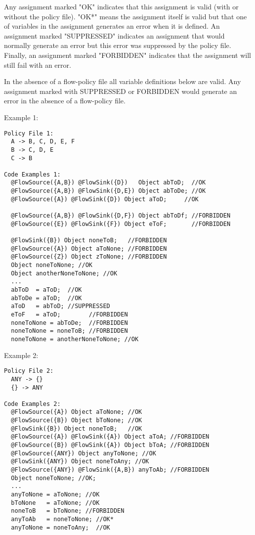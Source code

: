 Any assignment marked "OK" indicates that this assignment is valid
(with or without the policy file).  "OK*" means the assignment itself
is valid but that one of variables in the assignment generates an
error when it is defined.  An assignment marked "SUPPRESSED"
indicates an assignment that would normally generate an error but
this error was suppressed by the policy file.  Finally, an assignment
marked "FORBIDDEN" indicates that the assignment will still fail
with an error.

In the absence of a flow-policy file all variable definitions
below are valid.  Any assignment marked with SUPPRESSED or FORBIDDEN
would generate an error in the absence of a flow-policy file.

Example 1:
\begin{Verbatim}
Policy File 1:
  A -> B, C, D, E, F
  B -> C, D, E
  C -> B

Code Examples 1:
  @FlowSource({A,B}) @FlowSink({D})   Object abToD;  //OK
  @FlowSource({A,B}) @FlowSink({D,E}) Object abToDe; //OK
  @FlowSource({A}) @FlowSink({D}) Object aToD;     //OK

  @FlowSource({A,B}) @FlowSink({D,F}) Object abToDf; //FORBIDDEN
  @FlowSource({E}) @FlowSink({F}) Object eToF;       //FORBIDDEN

  @FlowSink({B}) Object noneToB;   //FORBIDDEN
  @FlowSource({A}) Object aToNone; //FORBIDDEN
  @FlowSource({Z}) Object zToNone; //FORBIDDEN
  Object noneToNone; //OK
  Object anotherNoneToNone; //OK
  ...
  abToD  = aToD;  //OK
  abToDe = aToD;  //OK
  aToD   = abToD; //SUPPRESSED
  eToF   = aToD;        //FORBIDDEN
  noneToNone = abToDe;  //FORBIDDEN
  noneToNone = noneToB; //FORBIDDEN
  noneToNone = anotherNoneToNone; //OK
\end{Verbatim}

Example 2:
\begin{Verbatim}
Policy File 2:
  ANY -> {}
  {} -> ANY

Code Examples 2:
  @FlowSource({A}) Object aToNone; //OK
  @FlowSource({B}) Object bToNone; //OK
  @FlowSink({B}) Object noneToB;   //OK
  @FlowSource({A}) @FlowSink({A}) Object aToA; //FORBIDDEN
  @FlowSource({B}) @FlowSink({A}) Object bToA; //FORBIDDEN
  @FlowSource({ANY}) Object anyToNone; //OK
  @FlowSink({ANY}) Object noneToAny; //OK
  @FlowSource({ANY}) @FlowSink({A,B}) anyToAb; //FORBIDDEN
  Object noneToNone; //OK;
  ...
  anyToNone = aToNone; //OK
  bToNone   = aToNone; //OK
  noneToB   = bToNone; //FORBIDDEN
  anyToAb   = noneToNone; //OK*
  anyToNone = noneToAny;  //OK
\end{Verbatim}

